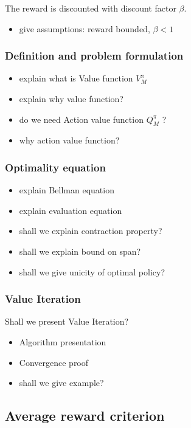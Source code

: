 The reward is discounted with discount factor $\beta$.

\begin{itemize}
    \item give assumptions: reward bounded, $\beta<1$
\end{itemize}

\subsubsection{Definition and problem formulation}

\begin{itemize}
    \item explain what is Value function $V^\pi_M$
    \item explain why value function?
    \item do we need Action value function $Q^\pi_M$ ?
    \item why action value function?
\end{itemize}

\subsubsection{Optimality equation}

\begin{itemize}
    \item explain Bellman equation
    \item explain evaluation equation 
    \item shall we explain contraction property?
    \item shall we explain bound on span?
    \item shall we give unicity of optimal policy?
\end{itemize}

\subsubsection{Value Iteration}

Shall we present Value Iteration?

\begin{itemize}
    \item Algorithm presentation
    \item Convergence proof
    \item shall we give example?
\end{itemize}

\subsection{Average reward criterion}

